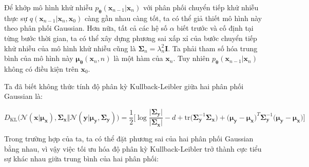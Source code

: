 \documentclass[14pt, a4paper]{article}
\numberwithin{equation}{section}
\numberwithin{figure}{section}
\numberwithin{dl}{section}
\numberwithin{md}{section}
\numberwithin{bd}{section}
\numberwithin{dn}{section}
\numberwithin{hq}{section}
\begin{document}
    Để khớp mô hình khử nhiễu $p_{\boldsymbol{\theta}} (\boldsymbol{x}_{n-1} \vert \boldsymbol{x}_n)$ với phân phối chuyển tiếp khử nhiễu thực sự $q(\boldsymbol{x}_{n-1} \vert \boldsymbol{x}_n, \boldsymbol{x}_0)$ càng gần nhau càng tốt, ta có thể giả thiết mô hình này theo phân phối Gaussian.
    Hơn nữa, tất cả các hệ số $\alpha$ biết trước và cố định tại từng bước thời gian, ta có thể xây dựng phương sai xấp xỉ của bước chuyển tiếp khử nhiễu của mô hình khử nhiễu cũng là $\boldsymbol{\Sigma}_n = \lambda_n^2 \boldsymbol{I}$.
    Ta phải tham số hóa trung bình của mô hình này $\boldsymbol{\mu}_{\boldsymbol{\theta}} (\boldsymbol{x}_n, n)$ là một hàm của $\boldsymbol{x}_n$.
    Tuy nhiên $p_{\boldsymbol{\theta}}(\boldsymbol{x}_{n-1} \vert \boldsymbol{x}_n)$ không có điều kiện trên $\boldsymbol{x}_0$.

    Ta đã biết không thức tính độ phân kỳ Kullback-Leibler giữa hai phân phối Gaussian là:

    \begin{equation}
        D_{\mathrm{KL}} \Big( \mathcal{N} (\boldsymbol{x} \vert \boldsymbol{\mu}_{\boldsymbol{x}}), \boldsymbol{\Sigma}_{\boldsymbol{x}} \Vert \mathcal{N} (\boldsymbol{y} \vert \boldsymbol{\mu}_{\boldsymbol{y}}, \boldsymbol{\Sigma}_{\boldsymbol{y}}) \Big) = \dfrac{1}{2} \Bigg \lbrack \log \dfrac{\lvert \boldsymbol{\Sigma}_{\boldsymbol{y}} \rvert}{\lvert \boldsymbol{\Sigma}_{\boldsymbol{x}} \rvert} - d + \mathrm{tr} \big( \boldsymbol{\Sigma}_{\boldsymbol{y}}^{-1} \boldsymbol{\Sigma}_{\boldsymbol{x}} \big) + \big( \boldsymbol{\mu}_{\boldsymbol{y}} - \boldsymbol{\mu}_{\boldsymbol{x}} \big)^T \boldsymbol{\Sigma}_{\boldsymbol{y}}^{-1} \big( \boldsymbol{\mu}_{\boldsymbol{y}} - \boldsymbol{\mu}_{\boldsymbol{x}} \big) \Bigg \rbrack
    \end{equation}

    Trong trường hợp của ta, ta có thể đặt phương sai của hai phân phối Gaussian bằng nhau, vì vậy việc tối ưu hóa độ phân kỳ Kullback-Leibler trở thành cực tiểu sự khác nhau giữa trung bình của hai phân phối:
\end{document}

